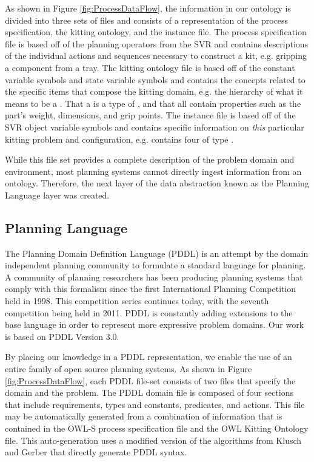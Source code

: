 As shown in Figure \ref{fig:ProcessDataFlow}, the information in our ontology is divided into three sets of files and consists of a representation of the process specification,
the kitting ontology, and the instance file. The process specification file is based off of the planning operators from the SVR and contains descriptions of
the individual actions and sequences necessary to construct a kit, e.g. gripping a component from a tray. The kitting ontology file is based off of the constant variable symbols and
state variable symbols and contains the concepts related to the specific items
that compose the kitting domain, e.g. the hierarchy of what it means to be a . That a  is a type of , and that
all  contain properties such as the part's weight, dimensions, and grip points. The instance file is based off of the SVR object variable symbols and
contains specific information on {\it this} particular kitting problem and configuration, e.g.   contains four  of type .

While this file set provides a complete description of the problem domain and environment, most planning systems cannot directly ingest information from an ontology.
Therefore, the next layer of the data abstraction known as the Planning Language layer was created.

\subsection{Planning Language}
The Planning Domain Definition Language (PDDL) \cite{PDDL} is an attempt by the domain independent planning community to formulate a standard language for planning. A community
of planning researchers has been producing planning systems that comply with this formalism since the first International Planning Competition held in 1998. This competition series
continues today, with the seventh competition being held in 2011. PDDL is constantly adding extensions to the base language in order to represent more expressive problem domains. Our
work is based on PDDL Version  3.0.

By placing our knowledge in a PDDL representation, we enable the use of an entire family of open source planning systems.
As shown in Figure \ref{fig:ProcessDataFlow}, each PDDL file-set consists of two files that specify the domain and the problem. The PDDL domain file is composed of four sections that include
requirements, types and constants, predicates, and actions. This file may be automatically generated from a combination of information that is contained in the OWL-S process specification file and the OWL Kitting Ontology file. This auto-generation uses a modified version of the algorithms from Klusch and Gerber \cite{Klusch2005} that directly generate PDDL syntax.

